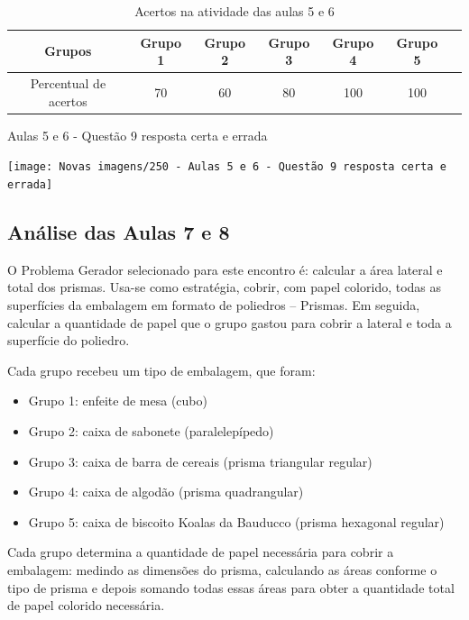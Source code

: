 \begin{table}[htbp] \centering
    \caption{Acertos na atividade das aulas 5 e 6} \label{tab:Acertos do Encontro 3}
    \begin{tabular}{|c|c|c|c|c|c|c|}
        \hline
        \textbf{Grupos}       & \textbf{Grupo 1} & \textbf{Grupo 2} & \textbf{Grupo 3} & \textbf{Grupo 4} & \textbf{Grupo 5} \\
        \hline
        Percentual de acertos & 70               & 60               & 80               & 100              & 100              \\
        \hline
    \end{tabular}
    \legend{\legendaTabela}
\end{table}

\begin{CenteredFigure}
    \caption{Aulas 5 e 6 - Questão 9 resposta certa e errada} \label{fig: 250 - Aulas 5 e 6 - Questao 9 resposta certa e errada}
    \texttt{[image: Novas imagens/250 - Aulas 5 e 6 - Questão 9 resposta certa e errada]}
    \legend{\autoria}
\end{CenteredFigure}

\subsection{Análise das Aulas 7 e 8}

O Problema Gerador selecionado para este encontro é: calcular a área lateral e total dos prismas. Usa-se como estratégia, cobrir, com papel colorido, todas as superfícies da embalagem em formato de poliedros – Prismas. Em seguida, calcular a quantidade de papel que o grupo gastou para cobrir a lateral e toda a superfície do poliedro.

Cada grupo recebeu um tipo de embalagem, que foram:

\begin{itemize}
    \item Grupo 1: enfeite de mesa (cubo)
    \item Grupo 2: caixa de sabonete (paralelepípedo)
    \item Grupo 3: caixa de barra de cereais (prisma triangular regular)
    \item Grupo 4: caixa de algodão (prisma quadrangular)
    \item Grupo 5: caixa de biscoito Koalas da Bauducco (prisma hexagonal regular)
\end{itemize}

Cada grupo determina a quantidade de papel necessária para cobrir a embalagem: medindo as dimensões do prisma, calculando as áreas conforme o tipo de prisma e depois somando todas essas áreas para obter a quantidade total de papel colorido necessária.

